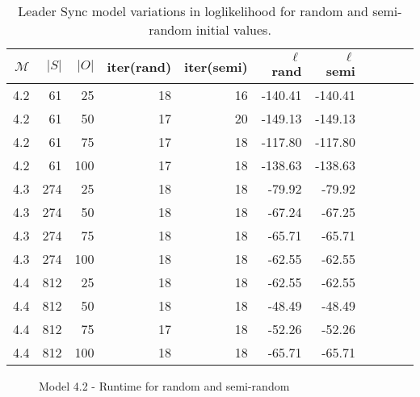 \begin{table}[htb!]
    \centering
    \caption{Leader Sync model variations in loglikelihood for random and semi-random initial values.}
    \label{tab:leader_results_loglikelihood}
    \begin{tabular}{rrrrrrrrrrr}
        \toprule
        $\mathcal{M}$ & $|S|$ & $|O|$ & iter(rand) & iter(semi) & $\ell$ rand & $\ell$ semi \\
        \midrule
        4.2           & 61    & 25    & 18         & 16         & -140.41     & -140.41     \\
        4.2           & 61    & 50    & 17         & 20         & -149.13     & -149.13     \\
        4.2           & 61    & 75    & 17         & 18         & -117.80     & -117.80     \\
        4.2           & 61    & 100   & 17         & 18         & -138.63     & -138.63     \\
        4.3           & 274   & 25    & 18         & 18         & -79.92      & -79.92      \\
        4.3           & 274   & 50    & 18         & 18         & -67.24      & -67.25      \\
        4.3           & 274   & 75    & 18         & 18         & -65.71      & -65.71      \\
        4.3           & 274   & 100   & 18         & 18         & -62.55      & -62.55      \\
        4.4           & 812   & 25    & 18         & 18         & -62.55      & -62.55      \\
        4.4           & 812   & 50    & 18         & 18         & -48.49      & -48.49      \\
        4.4           & 812   & 75    & 17         & 18         & -52.26      & -52.26      \\
        4.4           & 812   & 100   & 18         & 18         & -65.71      & -65.71      \\
        \bottomrule
    \end{tabular}
\end{table}



\begin{figure}[htb!]
    
    \caption{Model 4.2 - Runtime for random and semi-random}
    \label{fig:semirandom-cupaal-jajapy-4-2}
\end{figure}

